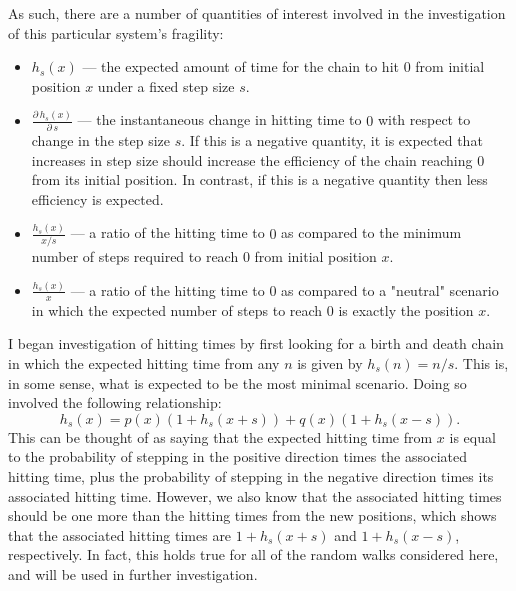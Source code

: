 As such, there are a number of quantities of interest involved in the investigation of this particular
system's fragility:
\begin{itemize}
    \item   $h_s(x)$ --- the expected amount of time for the chain to hit $0$ from initial position $x$
        under a fixed step size $s$.
    \item   $\frac{\partial\, h_s(x)}{\partial\, s}$ --- the instantaneous change in hitting time to $0$
        with respect to change in the step size $s$. If this is a negative quantity, it is expected
        that increases in step size should increase the efficiency of the chain reaching $0$ from its
        initial position. In contrast, if this is a negative quantity then less efficiency is expected.
    \item   $\frac{h_s(x)}{x/s}$ --- a ratio of the hitting time to $0$ as compared to the minimum number
        of steps required to reach $0$ from initial position $x$.
    \item   $\frac{h_s(x)}{x}$ --- a ratio of the hitting time to $0$ as compared to a "neutral" scenario
        in which the expected number of steps to reach $0$ is exactly the position $x$.
\end{itemize}

I began investigation of hitting times by first looking for a birth and death chain in which the
expected hitting time from any $n$ is given by $h_s(n) = n/s$. This is, in some sense, what is expected
to be the most minimal scenario. Doing so involved the following relationship:
\begin{equation}\label{hittingtime}
    h_s(x) = p(x)(1+h_s(x+s)) + q(x)(1+h_s(x-s)).
\end{equation}
This can be thought of as saying that the expected hitting time from $x$ is equal to the probability of
stepping in the positive direction times the associated hitting time, plus the probability of stepping
in the negative direction times its associated hitting time. However, we also know that the associated
hitting times should be one more than the hitting times from the new positions, which shows that the
associated hitting times are $1+h_s(x+s)$ and $1+h_s(x-s)$, respectively. In fact, this holds true for
all of the random walks considered here, and will be used in further investigation.

